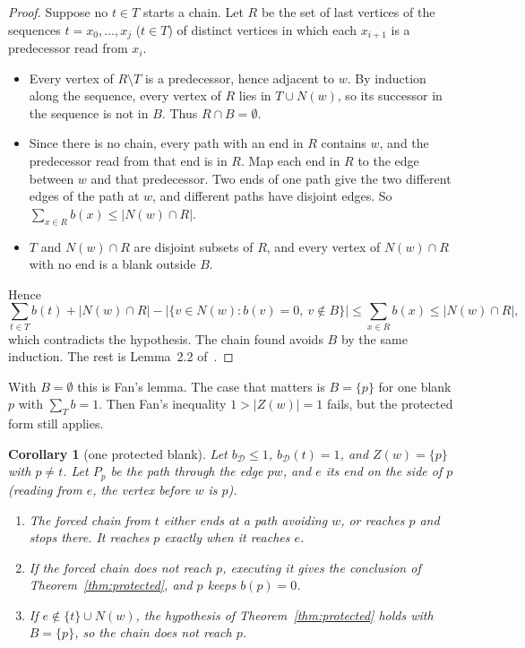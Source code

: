 \documentclass[11pt]{amsart}
\newtheorem{corollary}[theorem]{Corollary}
\theoremstyle{definition}
\newcommand{\cD}{\mathcal D}
\begin{document}
\begin{proof}
Suppose no $t\in T$ starts a chain. Let $R$ be the set of last vertices of the sequences
$t=x_0,\dots,x_j$ ($t\in T$) of distinct vertices in which each $x_{i+1}$ is a predecessor read from
$x_i$.
\begin{itemize}
\item Every vertex of $R\setminus T$ is a predecessor, hence adjacent to $w$. By induction along the
sequence, every vertex of $R$ lies in $T\cup N(w)$, so its successor in the sequence is not in $B$.
Thus $R\cap B=\emptyset$.
\item Since there is no chain, every path with an end in $R$ contains $w$, and the predecessor read
from that end is in $R$. Map each end in $R$ to the edge between $w$ and that predecessor. Two ends of
one path give the two different edges of the path at $w$, and different paths have disjoint edges.
So $\sum_{x\in R}b(x)\le|N(w)\cap R|$.
\item $T$ and $N(w)\cap R$ are disjoint subsets of $R$, and every vertex of $N(w)\cap R$ with no end
is a blank outside $B$.
\end{itemize}
Hence
\[\sum_{t\in T}b(t)+|N(w)\cap R|-\bigl|\{v\in N(w): b(v)=0,\ v\notin B\}\bigr|\le\sum_{x\in R}b(x)
\le |N(w)\cap R|,\]
which contradicts the hypothesis. The chain found avoids $B$ by the same induction. The rest is
Lemma~2.2 of~\cite{RD}.
\end{proof}

With $B=\emptyset$ this is Fan's lemma. The case that matters is $B=\{p\}$ for one blank $p$ with
$\sum_Tb=1$. Then Fan's inequality $1>|Z(w)|=1$ fails, but the protected form still applies.

\begin{corollary}[one protected blank]\label{cor:oneblank}
Let $b_\cD\le1$, $b_\cD(t)=1$, and $Z(w)=\{p\}$ with $p\ne t$. Let $P_p$ be the path through the edge
$pw$, and $e$ its end on the side of $p$ (reading from $e$, the vertex before $w$ is $p$).
\begin{enumerate}
\item The forced chain from $t$ either ends at a path avoiding $w$, or reaches $p$ and stops there.
It reaches $p$ exactly when it reaches $e$.
\item If the forced chain does not reach $p$, executing it gives the conclusion of
Theorem~\ref{thm:protected}, and $p$ keeps $b(p)=0$.
\item If $e\notin\{t\}\cup N(w)$, the hypothesis of Theorem~\ref{thm:protected} holds with
$B=\{p\}$, so the chain does not reach $p$.
\end{enumerate}
\end{corollary}
\end{document}
